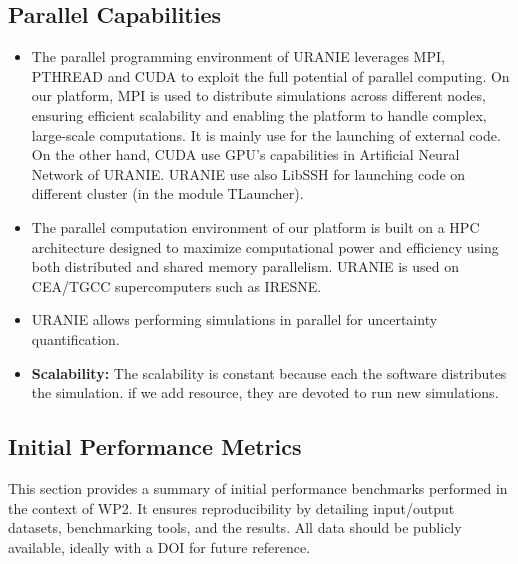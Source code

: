 \subsection{Parallel Capabilities}
\label{sec:WP2:Uranie:performances}


\begin{itemize}
    \item The parallel programming environment of URANIE leverages MPI, PTHREAD
    and CUDA to exploit the full potential of parallel computing. 
    On our platform, MPI is used to distribute simulations across different nodes,
    ensuring efficient scalability and enabling the platform to handle complex, large-scale computations. It is mainly use for the launching of external code.
    On the other hand, CUDA use GPU's capabilities in Artificial Neural Network of URANIE.
    URANIE use also LibSSH for launching code on different cluster (in the module TLauncher).

    \item The parallel computation environment of our platform is built on a HPC architecture designed to maximize computational power and efficiency
    using both distributed and shared memory parallelism. URANIE is used on CEA/TGCC supercomputers such as IRESNE.

    \item URANIE allows performing simulations in parallel for uncertainty quantification.
    \item \textbf{Scalability:} The scalability is constant because each the software distributes the simulation. if we add resource, they are devoted to run new simulations.
\end{itemize}


\subsection{Initial Performance Metrics}
\label{sec:WP2:Uranie:metrics}

This section provides a summary of initial performance benchmarks performed in the context of WP2. It ensures reproducibility by detailing input/output datasets, benchmarking tools, and the results. All data should be publicly available, ideally with a DOI for future reference.

